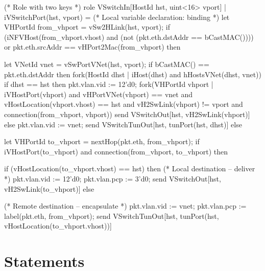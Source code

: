 \documentclass{report}
\begin{document}
\begin{dllisting}{}
(* Role with two keys *)
role VSwitchIn[HostId hst, uint<16> vport] | iVSwitchPort(hst, vport) = 
    (* Local variable declaration: binding *)
    let VHPortId from_vhport = vSw2HLink(hst, vport);
    if (iNFVHost(from_vhport.vhost) and (not (pkt.eth.dstAddr == bCastMAC()))) or 
       pkt.eth.srcAddr == vHPort2Mac(from_vhport) then {
        let VNetId vnet = vSwPortVNet(hst, vport);
        if bCastMAC() == pkt.eth.dstAddr then {
            fork(HostId dhst | iHost(dhst) and hHostsVNet(dhst, vnet)) {
                if dhst == hst then {
                    pkt.vlan.vid := 12'd0;
                    fork(VHPortId vhport | iVHostPort(vhport) and 
                                           vHPortVNet(vhport) == vnet and 
                                           vHostLocation(vhport.vhost) == hst and 
                                           vH2SwLink(vhport) != vport and
                                           connection(from_vhport, vhport)) {
                        send VSwitchOut[hst, vH2SwLink(vhport)]
                    }
                } else {
                    pkt.vlan.vid := vnet;
                    send VSwitchTunOut[hst, tunPort(hst, dhst)]
                }
            }
        } else {
            let VHPortId to_vhport = nextHop(pkt.eth, from_vhport);
            if iVHostPort(to_vhport) and connection(from_vhport, to_vhport) then {
                if (vHostLocation(to_vhport.vhost) == hst) then { 
                    (* Local destination -- deliver *)
                    pkt.vlan.vid := 12'd0;
                    pkt.vlan.pcp := 3'd0;
                    send VSwitchOut[hst, vH2SwLink(to_vhport)]
                } else {
                    (* Remote destination -- encapsulate *)
                    pkt.vlan.vid := vnet;
                    pkt.vlan.pcp := label(pkt.eth, from_vhport);
                    send VSwitchTunOut[hst, 
                                       tunPort(hst, 
                                               vHostLocation(to_vhport.vhost))]

                }
            }
        }
    }
\end{dllisting}

\section{Statements}
\end{document}
